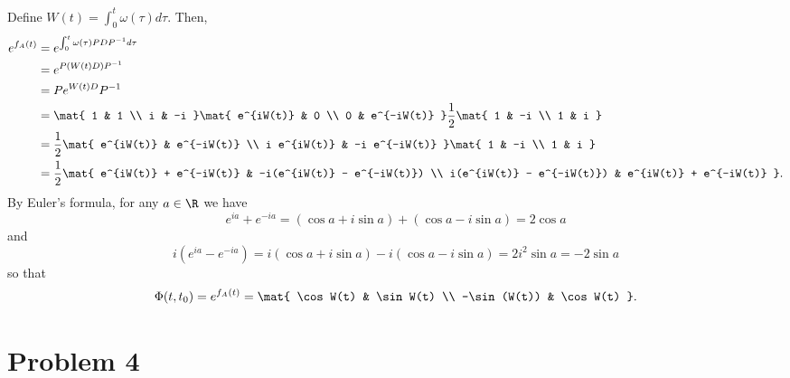 \documentclass{homework}
\begin{document}
Define $W(t) = \int_{0}^{t} \omega(\tau) d\tau$. Then,
\begin{align*}
    e^{f_A(t)} &= e^{\int_{0}^{t} \omega(\tau) PDP^{-1}d\tau} \\
        &= e^{P (W(t) D) P^{-1}} \\
        &= P e^{W(t) D} P^{-1} \\
        &= \mat{
            1 & 1 \\
            i & -i
        } \mat{
            e^{iW(t)} & 0 \\
            0  & e^{-iW(t)}
        } \frac{1}{2} \mat{
            1 & -i \\
            1 & i
        } \\
        &= \frac{1}{2} \mat{
            e^{iW(t)} & e^{-iW(t)} \\
            i e^{iW(t)} & -i e^{-iW(t)}
        } \mat{
            1 & -i \\
            1 & i
        } \\
        &= \frac{1}{2} \mat{
            e^{iW(t)} + e^{-iW(t)} & -i(e^{iW(t)} - e^{-iW(t)}) \\
            i(e^{iW(t)} - e^{-iW(t)}) & e^{iW(t)} + e^{-iW(t)}
        }.
\end{align*}
By Euler's formula, for any $a \in \R$ we have
\begin{equation*}
    e^{ia} + e^{-ia} = (\cos a + i \sin a) + (\cos a - i \sin a) = 2\cos a
\end{equation*}
and 
\begin{equation*}
    i(e^{ia} - e^{-ia}) = i(\cos a + i\sin a) - i(\cos a - i \sin a) = 2i^2\sin a = -2 \sin a
\end{equation*}
so that
\begin{equation}
    \Phi(t, t_0) = e^{f_A(t)} = \mat{
        \cos W(t) & \sin W(t) \\
        -\sin(W(t)) & \cos W(t)
    }.
    \label{eq:exponential-of-skew-integral}
\end{equation}

\section{Problem 4}
\end{document}
